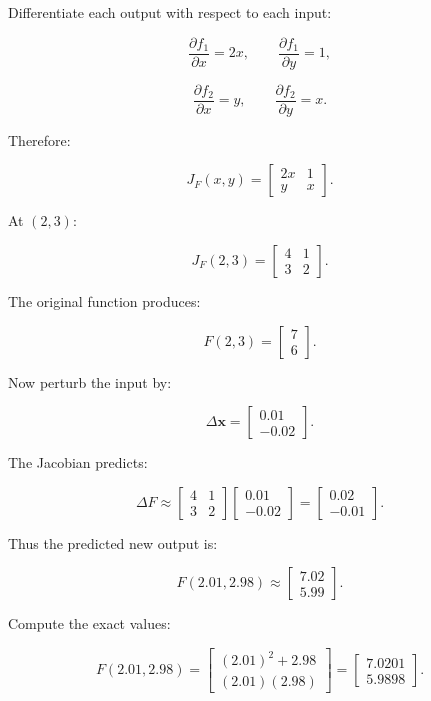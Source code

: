 Differentiate each output with respect to each input:

\[
\frac{\partial f_1}{\partial x}=2x,\qquad \frac{\partial f_1}{\partial y}=1,
\]

\[
\frac{\partial f_2}{\partial x}=y,\qquad \frac{\partial f_2}{\partial y}=x.
\]

Therefore:

\[
\boxed{ J_F(x,y)= \begin{bmatrix} 2x&1\\ y&x \end{bmatrix} }.
\]

At \((2,3)\):

\[
J_F(2,3)= \begin{bmatrix} 4&1\\ 3&2 \end{bmatrix}.
\]

The original function produces:

\[
F(2,3)= \begin{bmatrix}7\\6\end{bmatrix}.
\]

Now perturb the input by:

\[
\Delta\mathbf x= \begin{bmatrix} 0.01\\-0.02 \end{bmatrix}.
\]

The Jacobian predicts:

\[
\Delta F\approx \begin{bmatrix} 4&1\\ 3&2 \end{bmatrix} \begin{bmatrix} 0.01\\-0.02 \end{bmatrix} = \begin{bmatrix} 0.02\\-0.01 \end{bmatrix}.
\]

Thus the predicted new output is:

\[
F(2.01,2.98)\approx \begin{bmatrix} 7.02\\5.99 \end{bmatrix}.
\]

Compute the exact values:

\[
F(2.01,2.98)= \begin{bmatrix} (2.01)^2+2.98\\ (2.01)(2.98) \end{bmatrix} = \begin{bmatrix} 7.0201\\ 5.9898 \end{bmatrix}.
\]

